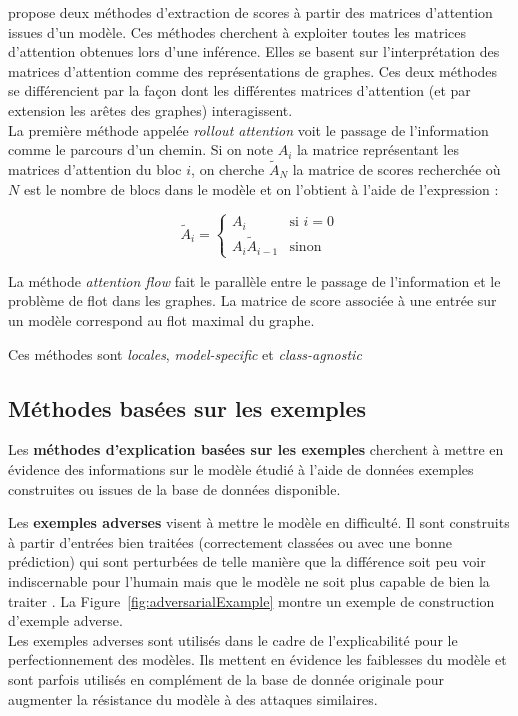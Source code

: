 \documentclass{report}
\begin{document}
        \cite{abnar_quantifying_2020} propose deux méthodes d'extraction de scores à partir des matrices d'attention issues d'un modèle. Ces méthodes cherchent à exploiter toutes les matrices d'attention obtenues lors d'une inférence. Elles se basent sur l'interprétation des matrices d'attention comme des représentations de graphes. Ces deux méthodes se différencient par la façon dont les différentes matrices d'attention (et par extension les arêtes des graphes) interagissent.\\
        La première méthode appelée \emph{rollout attention} voit le passage de l'information comme le parcours d'un chemin. Si on note $A_i$ la matrice représentant les matrices d'attention du bloc $i$, on cherche $\tilde{A}_N$ la matrice de scores recherchée où $N$ est le nombre de blocs dans le modèle et on l'obtient à l'aide de l'expression :
        
        $$\tilde{A}_i = \left\{\begin{array}{ll}
        A_i & \text{si } i = 0\\
        A_i\tilde{A}_{i-1} & \text{sinon}
        \end{array}\right.
         $$
        
        La méthode \emph{attention flow} fait le parallèle entre le passage de l'information et le problème de flot dans les graphes. La matrice de score associée à une entrée sur un modèle correspond au flot maximal du graphe.
        
       Ces méthodes sont \emph{locales}, \emph{model-specific} et \emph{class-agnostic}
        
    
    \subsection{Méthodes basées sur les exemples}
        
        Les \textbf{méthodes d'explication basées sur les exemples} cherchent à mettre en évidence des informations sur le modèle étudié à l'aide de données exemples construites ou issues de la base de données disponible.
        
        Les \textbf{exemples adverses} visent à mettre le modèle en difficulté. Il sont construits à partir d'entrées bien traitées (correctement classées ou avec une bonne prédiction) qui sont perturbées de telle manière que la différence soit peu voir indiscernable pour l'humain mais que le modèle ne soit plus capable de bien la traiter \cite[Chap~30]{molnar_interpretable_2025}. La Figure~\ref{fig:adversarialExample} montre un exemple de construction d'exemple adverse.\\
        Les exemples adverses sont utilisés dans le cadre de l'explicabilité pour le perfectionnement des modèles. Ils mettent en évidence les faiblesses du modèle et sont parfois utilisés en complément de la base de donnée originale pour augmenter la résistance du modèle à des attaques similaires.
        
\end{document}
